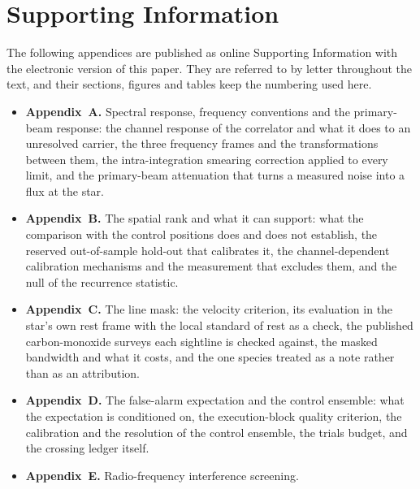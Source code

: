 \section*{Supporting Information}
The following appendices are published as online Supporting Information with
the electronic version of this paper. They are referred to by letter
throughout the text, and their sections, figures and tables keep the
numbering used here.

\begin{itemize}[nosep,leftmargin=1.2em]
\item \textbf{Appendix~A.} Spectral response, frequency conventions and the
  primary-beam response: the channel response of the correlator and what it
  does to an unresolved carrier, the three frequency frames and the
  transformations between them, the intra-integration smearing correction
  applied to every limit, and the primary-beam attenuation that turns a
  measured noise into a flux at the star.
\item \textbf{Appendix~B.} The spatial rank and what it can support: what the
  comparison with the \NCtrl{} control positions does and does not establish,
  the reserved out-of-sample hold-out that calibrates it, the channel-dependent
  calibration mechanisms and the measurement that excludes them, and the null
  of the recurrence statistic.
\item \textbf{Appendix~C.} The line mask: the velocity criterion, its
  evaluation in the star's own rest frame with the local standard of rest
  as a check, the
  published carbon-monoxide surveys each sightline is checked against, the
  masked bandwidth and what it costs, and the one species treated as a note
  rather than as an attribution.
\item \textbf{Appendix~D.} The false-alarm expectation and the control
  ensemble: what the expectation is conditioned on, the execution-block
  quality criterion, the calibration and the resolution of the control
  ensemble, the trials budget, and the crossing ledger itself.
\item \textbf{Appendix~E.} Radio-frequency interference screening.
\end{itemize}
